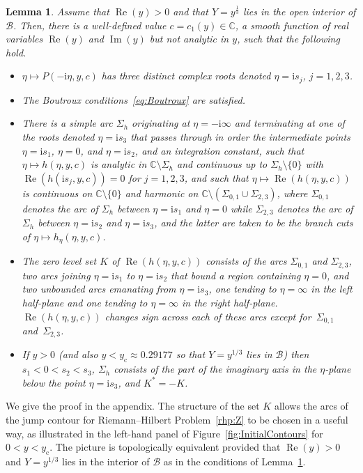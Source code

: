 \documentclass[pdftex]{sigma}
\numberwithin{equation}{section}
\newtheorem{Lemma}[Theorem]{Lemma}
\begin{document}
\begin{Lemma}\label{lem:h}
Assume that $\operatorname{Re}(y)>0$ and that $Y=y^\frac{1}{3}$ lies in the open interior of $\mathcal{B}$. Then, there is a well-defined value $c=c_1(y)\in\mathbb{C}$, a smooth function of real variables $\operatorname{Re}(y)$ and $\operatorname{Im}(y)$ but not analytic in $y$, such that the
following hold.
\begin{itemize}\itemsep=0pt
\item $\eta\mapsto P(-\mathrm{i}\eta,y,c)$ has three distinct complex roots denoted $\eta=\mathrm{i} s_j$, $j=1,2,3$.
\item The Boutroux conditions~\eqref{eq:Boutroux} are satisfied.
\item There is a simple arc $\Sigma_h$ originating at $\eta=-\mathrm{i}\infty$ and terminating at one of the roots denoted $\eta=\mathrm{i} s_3$ that passes through in order the intermediate points $\eta=\mathrm{i} s_1$, $\eta=0$, and $\eta=\mathrm{i} s_2$, and an integration constant, such that $\eta\mapsto h(\eta,y,c)$ is analytic in $\mathbb{C}\setminus\Sigma_h$ and continuous up to $\Sigma_h\setminus\{0\}$
with
$\operatorname{Re}(h(\mathrm{i} s_j,y,c))=0$ for $j=1,2,3$, and such that $\eta\mapsto \operatorname{Re}(h(\eta,y,c))$ is continuous on $\mathbb{C}\setminus\{0\}$ and harmonic on $\mathbb{C}\setminus (\Sigma_{0,1}\cup\Sigma_{2,3})$, where $\Sigma_{0,1}$ denotes the arc of $\Sigma_h$ between $\eta=\mathrm{i} s_1$ and $\eta=0$ while $\Sigma_{2,3}$ denotes the arc of $\Sigma_h$ between $\eta=\mathrm{i} s_2$ and $\eta=\mathrm{i} s_3$, and the latter are taken to be the branch cuts of $\eta\mapsto h_\eta(\eta,y,c)$.
\item The zero level set $K$ of $\operatorname{Re}(h(\eta,y,c))$ consists of the arcs $\Sigma_{0,1}$ and $\Sigma_{2,3}$, two arcs joining $\eta=\mathrm{i} s_1$ to $\eta=\mathrm{i} s_2$ that bound a region containing $\eta=0$, and two unbounded arcs emanating from $\eta=\mathrm{i} s_3$, one tending to $\eta=\infty$ in the left half-plane and one tending to $\eta=\infty$ in the right half-plane. $\operatorname{Re}(h(\eta,y,c))$ changes sign across each of these arcs except for~$\Sigma_{0,1}$ and~$\Sigma_{2,3}$.
\item If $y>0$ \big(and also $y<y_\mathrm{c}\approx 0.29177$ so that $Y=y^{1/3}$ lies in $\mathcal{B}$\big) then $s_1<0<s_2<s_3$, $\Sigma_h$ consists of the part of the imaginary axis in the $\eta$-plane below the point $\eta=\mathrm{i} s_3$, and $K^*=-K$.
\end{itemize}
\end{Lemma}
We give the proof in the appendix. The structure of the set $K$ allows the arcs of the jump contour for Riemann--Hilbert Problem~\ref{rhp:Z} to be chosen in a useful way, as illustrated in the left-hand panel of Figure~\ref{fig:InitialContours} for $0<y<y_\mathrm{c}$.
The picture is topologically equivalent provided that $\operatorname{Re}(y)>0$ and $Y=y^{1/3}$ lies in the interior of $\mathcal{B}$ as in the conditions of Lemma~\ref{lem:h}.
\end{document}
